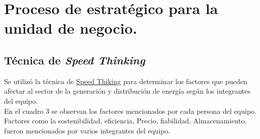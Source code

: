 \documentclass{article}
\begin{document}
\section{Proceso de estratégico para la unidad de negocio.}
\subsection{Técnica de \textit{Speed Thinking}}
Se utilizó la técnica de \href{https://upvedues-my.sharepoint.com/:b:/g/personal/jjgralop_upv_edu_es/EWA5ZRDOYpNIp2X1rahk_8IBIYG8gKvQJj9uIZHmW4Mf-Q?e=OrpQcz}{Speed Thiking} para determinar los factores que pueden afectar al sector de la generación y distribución de energía según los integrantes del equipo. 
\\

En el cuadro 3 se observan los factores mencionados por cada persona del equipo. 
\\
Factores como la sostenibilidad, eficiencia, Precio, fiabilidad, Almacenamiento, fueron mencionados por varios integrantes del equipo. 
\end{document}
